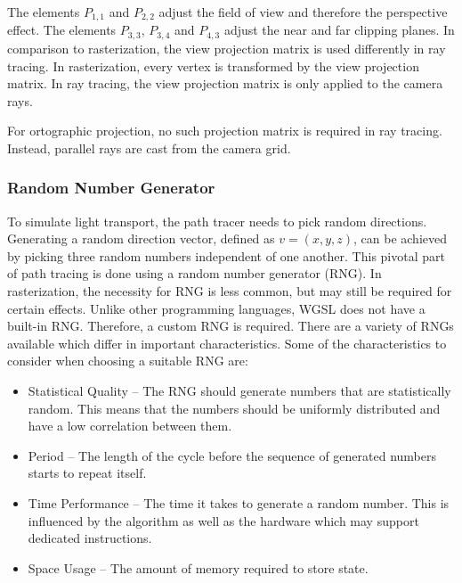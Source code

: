 The elements $P_{1,1}$ and $P_{2,2}$ adjust the field of view and therefore the perspective effect. The elements $P_{3,3}$, $P_{3,4}$ and $P_{4,3}$ adjust the near and far clipping planes. In comparison to rasterization, the view projection matrix is used differently in ray tracing. In rasterization, every vertex is transformed by the view projection matrix. In ray tracing, the view projection matrix is only applied to the camera rays.

For ortographic projection, no such projection matrix is required in ray tracing. Instead, parallel rays are cast from the camera grid.

\subsubsection{Random Number Generator}
  
To simulate light transport, the path tracer needs to pick random directions. Generating a random direction vector, defined as $v = (x, y, z)$, can be achieved by picking three random numbers independent of one another. This pivotal part of path tracing is done using a random number generator (\gls{RNG}). In rasterization, the necessity for \gls{RNG} is less common, but may still be required for certain effects. Unlike other programming languages, \gls{WGSL} does not have a built-in \gls{RNG}. Therefore, a custom \gls{RNG} is required. There are a variety of \glspl{RNG} available which differ in important characteristics. Some of the characteristics to consider when choosing a suitable \gls{RNG} are:

\begin{itemize}
    \item{Statistical Quality} – The \gls{RNG} should generate numbers that are statistically random. This means that the numbers should be uniformly distributed and have a low correlation between them.
    \item{Period} – The length of the cycle before the sequence of generated numbers starts to repeat itself.
    \item{Time Performance} – The time it takes to generate a random number. This is influenced by the algorithm as well as the hardware which may support dedicated instructions.
    \item{Space Usage} – The amount of memory required to store state.
\end{itemize}

